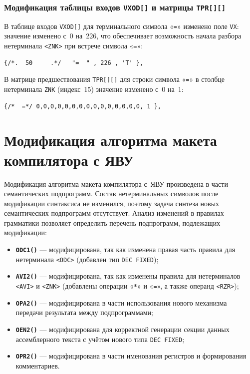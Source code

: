 \documentclass[a4paper,14pt]{extarticle}
\begin{document}
\subsubsection*{Модификация таблицы входов \texttt{VXOD[]} и матрицы \texttt{TPR[][]}}

В таблице входов \texttt{VXOD[]} для терминального символа «\texttt{=}» изменено
поле \texttt{VX}: значение изменено с~0 на~226, что обеспечивает возможность
начала разбора нетерминала \texttt{<ZNK>} при встрече символа «\texttt{=}»:

\begin{lstlisting}[style=Cstyle,caption={Изменение в \texttt{VXOD[]} для символа «=»},label=lst:vxod]
  {/*.  50     .*/   "=  " , 226 , 'T' },
\end{lstlisting}

В матрице предшествования \texttt{TPR[][]} для строки символа «\texttt{=}» в
столбце нетерминала \texttt{ZNK} (индекс~15) значение изменено с~0 на~1:

\begin{lstlisting}[style=Cstyle,caption={Изменение в \texttt{TPR[][]} для символа «=» и нетерминала ZNK},label=lst:tpr]
  {/*  =*/ 0,0,0,0,0,0,0,0,0,0,0,0,0,0,0, 1 },
\end{lstlisting}

\section{Модификация алгоритма макета компилятора с ЯВУ}

Модификация алгоритма макета компилятора с~ЯВУ произведена в части семантических
подпрограмм. Состав нетерминальных символов после модификации синтаксиса не
изменился, поэтому задача синтеза новых семантических подпрограмм отсутствует.
Анализ изменений в правилах грамматики позволяет определить перечень подпрограмм,
подлежащих модификации:

\begin{itemize}
  \item \textbf{\texttt{ODC1()}} — модифицирована, так как изменена правая часть
        правила для нетерминала \texttt{<ODC>} (добавлен тип \texttt{DEC FIXED});
  \item \textbf{\texttt{AVI2()}} — модифицирована, так как изменены правила для
        нетерминалов \texttt{<AVI>} и \texttt{<ZNK>} (добавлены операции «\texttt{*}» и «\texttt{=}»,
        а также операнд \texttt{<RZR>});
  \item \textbf{\texttt{OPA2()}} — модифицирована в части использования нового
        механизма передачи результата между подпрограммами;
  \item \textbf{\texttt{OEN2()}} — модифицирована для корректной генерации секции
        данных ассемблерного текста с учётом нового типа \texttt{DEC FIXED};
  \item \textbf{\texttt{OPR2()}} — модифицирована в части именования регистров
        и формирования комментариев.
\end{itemize}
\end{document}
